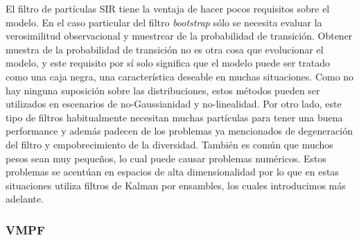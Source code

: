 El filtro de partículas SIR tiene la ventaja de hacer pocos requisitos sobre el modelo. En el caso particular del filtro \textit{bootstrap} sólo se necesita evaluar la verosimilitud observacional y muestrear de la probabilidad de transición. Obtener muestra de la probabilidad de transición no es otra cosa que evolucionar el modelo, y este requisito por sí solo significa que el modelo puede ser tratado como una caja negra, una característica deseable en muchas situaciones. Como no hay ninguna suposición sobre las distribuciones, estos métodos pueden ser utilizados en escenarios de no-Gaussianidad y no-linealidad. Por otro lado, este tipo de filtros habitualmente necesitan muchas partículas para tener una buena performance y además padecen de los problemas ya mencionados de degeneración del filtro y empobrecimiento de la diversidad. También es común que muchos pesos sean muy pequeños, lo cual puede causar problemas numéricos. Estos problemas se acentúan en espacios de alta dimensionalidad por lo que en estas situaciones  utiliza filtros de Kalman por ensambles, los cuales introducimos más adelante. 

\subsubsection{VMPF}


